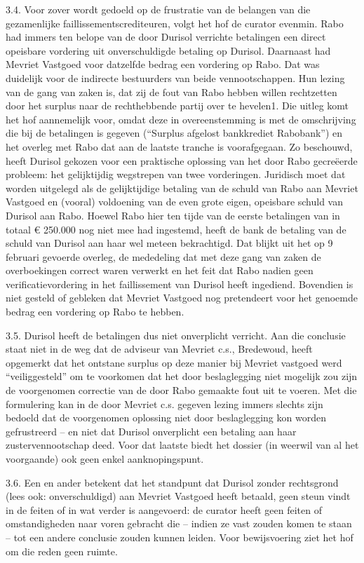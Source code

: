 \documentclass[
  dutch,
  a4paper,
]{article}
\begin{document}
3.4. Voor zover wordt gedoeld op de frustratie van de belangen van die gezamenlijke faillissementscrediteuren, volgt het hof de curator evenmin. Rabo had immers ten belope van de door Durisol verrichte betalingen een direct opeisbare vordering uit onverschuldigde betaling op Durisol. Daarnaast had Mevriet Vastgoed voor datzelfde bedrag een vordering op Rabo. Dat was duidelijk voor de indirecte bestuurders van beide vennootschappen. Hun lezing van de gang van zaken is, dat zij de fout van Rabo hebben willen rechtzetten door het surplus naar de rechthebbende partij over te hevelen1. Die uitleg komt het hof aannemelijk voor, omdat deze in overeenstemming is met de omschrijving die bij de betalingen is gegeven (``Surplus afgelost bankkrediet Rabobank'') en het overleg met Rabo dat aan de laatste tranche is voorafgegaan. Zo beschouwd, heeft Durisol gekozen voor een praktische oplossing van het door Rabo gecreëerde probleem: het gelijktijdig wegstrepen van twee vorderingen. Juridisch moet dat worden uitgelegd als de gelijktijdige betaling van de schuld van Rabo aan Mevriet Vastgoed en (vooral) voldoening van de even grote eigen, opeisbare schuld van Durisol aan Rabo. Hoewel Rabo hier ten tijde van de eerste betalingen van in totaal € 250.000 nog niet mee had ingestemd, heeft de bank de betaling van de schuld van Durisol aan haar wel meteen bekrachtigd. Dat blijkt uit het op 9 februari gevoerde overleg, de mededeling dat met deze gang van zaken de overboekingen correct waren verwerkt en het feit dat Rabo nadien geen verificatievordering in het faillissement van Durisol heeft ingediend. Bovendien is niet gesteld of gebleken dat Mevriet Vastgoed nog pretendeert voor het genoemde bedrag een vordering op Rabo te hebben.

3.5. Durisol heeft de betalingen dus niet onverplicht verricht. Aan die conclusie staat niet in de weg dat de adviseur van Mevriet c.s., Bredewoud, heeft opgemerkt dat het ontstane surplus op deze manier bij Mevriet vastgoed werd ``veiliggesteld'' om te voorkomen dat het door beslaglegging niet mogelijk zou zijn de voorgenomen correctie van de door Rabo gemaakte fout uit te voeren. Met die formulering kan in de door Mevriet c.s. gegeven lezing immers slechts zijn bedoeld dat de voorgenomen oplossing niet door beslaglegging kon worden gefrustreerd -- en niet dat Durisol onverplicht een betaling aan haar zustervennootschap deed. Voor dat laatste biedt het dossier (in weerwil van al het voorgaande) ook geen enkel aanknopingspunt.

3.6. Een en ander betekent dat het standpunt dat Durisol zonder rechtsgrond (lees ook: onverschuldigd) aan Mevriet Vastgoed heeft betaald, geen steun vindt in de feiten of in wat verder is aangevoerd: de curator heeft geen feiten of omstandigheden naar voren gebracht die -- indien ze vast zouden komen te staan -- tot een andere conclusie zouden kunnen leiden. Voor bewijsvoering ziet het hof om die reden geen ruimte.
\end{document}
